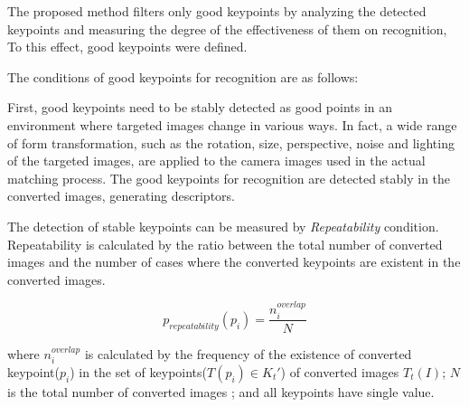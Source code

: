 
The proposed method filters only good keypoints by analyzing the detected keypoints and measuring the degree of the effectiveness of them on recognition, To this effect, good keypoints were defined. 

The conditions of good keypoints for recognition are as follows: 

First, good keypoints need to be stably detected as good points in an environment where targeted images change in various ways. In fact, a wide range of form transformation, such as the rotation, size, perspective, noise and lighting of the targeted images, are applied to the camera images used in the actual matching process. The good keypoints for recognition are detected stably in the converted images, generating descriptors. 

The detection of stable keypoints can be measured by \textit{Repeatability} condition. Repeatability is calculated by the ratio between the total number of converted images and the number of cases where the converted keypoints are existent in the converted images. 


\begin{equation}
p_{repeatability}(p_i) = \frac{n_i^{overlap}}{N}
\end{equation}


where $n_i^{overlap}$ is calculated by the frequency of the existence of converted keypoint($p_i$) in the set of keypoints($T(p_i)\in K_t'$) of converted images $T_t(I)$; $N$ is the total number of converted images ; and all keypoints have single value. 

